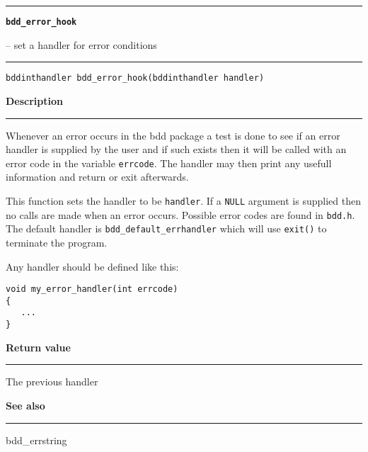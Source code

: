 \begin{minipage}{\textwidth}

\noindent\begin{minipage}{\textwidth}
\rule{\textwidth}{0.5mm}
{\tt\bf bdd\_error\_hook }
\--- set a handler for error conditions  \hspace{\fill}
\\\rule[1.5ex]{\textwidth}{0.5mm}
\end{minipage}

\noindent\begin{verbatim}
bddinthandler bdd_error_hook(bddinthandler handler) 
\end{verbatim}

\vspace{\parsep}\noindent
{\bf Description}\\\rule[1.5ex]{\textwidth}{0.2mm}\vspace{-1.5ex}\setlength{\parindent}{1em}
Whenever an error occurs in the bdd package a test is done to
        see if an error handler is supplied by the user and if such exists
	then it will be called
	with an error code in the variable {\tt errcode}. The handler may
	then print any usefull information and return or exit afterwards.

	This function sets the handler to be {\tt handler}. If a {\tt NULL}
	argument is supplied then no calls are made when an error occurs.
	Possible error codes are found in {\tt bdd.h}. The default handler
	is {\tt bdd\_default\_errhandler} which will use {\tt exit()} to
	terminate the program.

	Any handler should be defined like this:
	\begin{verbatim}
void my_error_handler(int errcode)
{
   ...
}
\end{verbatim} 

\setlength{\parindent}{0em}\vspace{\parsep}\vspace{\baselineskip}\noindent
{\bf Return value}\\\rule[1.5ex]{\textwidth}{0.2mm}\vspace{-1.5ex}
The previous handler 

\vspace{\parsep}\vspace{\baselineskip}\noindent
{\bf See also}\\\rule[1.5ex]{\textwidth}{0.2mm}\vspace{-1.5ex}
bdd\_errstring 
\end{minipage}

